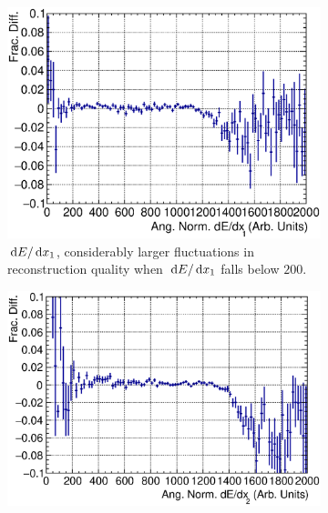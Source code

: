   \begin{figure}[ht]
      \centering
      \begin{subfigure}{\dbfigwid\textwidth}
           \includegraphics[width=\textwidth]{figures/sel/fig53a.eps}
           \caption{$\,\textrm{d}E/\,\textrm{d}x_1$, considerably larger fluctuations in reconstruction quality when $\,\textrm{d}E/\,\textrm{d}x_1$ falls below $200$.}
           \label{subfig:ans-dedx0-ppr-slice}
      \end{subfigure}
      \begin{subfigure}{\dbfigwid\textwidth}
           \includegraphics[width=\textwidth]{figures/sel/fig53b.eps}

\end{subfigure}
\end{figure}
